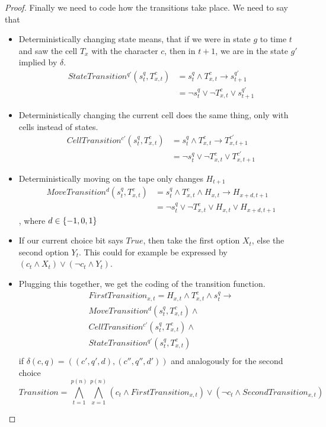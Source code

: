 \begin{proof}
	Finally we need to code how the transitions take place. We need to say that
	\begin{itemize}
		\item Deterministically changing state means, that if we were in state $g$ 
			to time $t$ and saw the cell $T_x$ with the character $c$, then in $t+1$,
			we are in the state $g'$ implied by $\delta$.
			\begin{align}
				StateTransition^{q'}(s^q_t, T^c_{x,t}) 
									&= s^q_{t}\wedge T^c_{x,t} \rightarrow s^{q'}_{t+1}\\
									&= \lnot s^q_{t} \vee \lnot T^c_{x,t}\vee s^{q'}_{t+1}
			\end{align} 
		\item Deterministically changing the current cell does the same thing, 
			only with cells instead of states.
			\begin{align}
				CellTransition^{c'}(s^q_t, T^c_{x,t}) 
									&= s^q_{t}\wedge T^c_{x,t} \rightarrow T^{c'}_{x,t+1}\\
									&= \lnot s^q_{t} \vee \lnot T^c_{x,t}\vee T^{c'}_{x,t+1}
			\end{align} 

		\item Deterministically moving on the tape only changes $H_{t+1}$
			\begin{align}
				MoveTransition^d(s^q_t, T^c_{x,t}) 
				&= s^q_{t}\wedge T^c_{x,t} \wedge H_{x,t} \rightarrow H_{x+d,t+1}\\
									&= \lnot s^q_{t} \vee \lnot T^c_{x,t}\vee H_{x,t}\vee H_{x+d,t+1}
			\end{align},
			where $d\in \left\{ -1,0,1 \right\}$
		\item If our current choice bit says $True$, then take the first option $X_t$, 
			else the second option $Y_t$. This could for example be expressed by 
			$(c_t \wedge X_t) \vee (\lnot c_t \wedge Y_t)$.

		\item Plugging this together, we get the coding of the transition 
			function.
			\begin{multline}
				FirstTransition_{x,t} 
				= H_{x,t}\wedge T^c_{x,t}\wedge s^q_{t} \rightarrow
				\\ MoveTransition^{d}(s^q_t, T^c_{x,t}) \wedge 
				\\ CellTransition^{c'}(s^q_t, T^c_{x,t}) \wedge
				\\ StateTransition^{q'}(s^q_t, T^c_{x,t}) \\
			\end{multline}
			if $\delta(c,q) = \left((c', q', d), (c'', q'', d')\right)$ and analogously for 
			the second choice
			\begin{equation}
				Transition = \bigwedge_{t=1}^{p(n)}\bigwedge_{x=1}^{p(n)} 
							(c_t \wedge FirstTransition_{x,t}) \vee 
							(\lnot  c_t \wedge SecondTransition_{x, t})
			\end{equation}


\end{itemize}
\end{proof}

